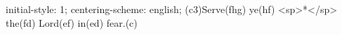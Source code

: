 initial-style: 1;
centering-scheme: english;
(c3)Serve(fhg) ye(hf) <sp>*</sp> the(fd) Lord(ef) in(ed) fear.(c)
